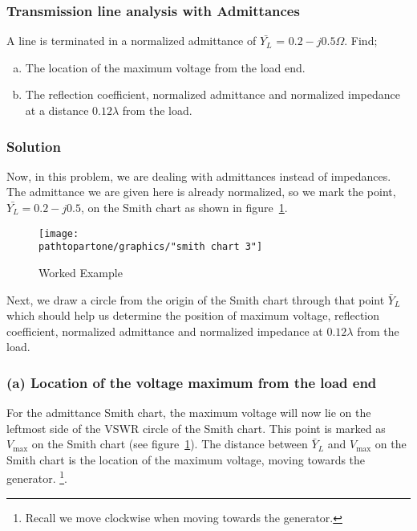 \begin{exmp}
\subsubsection*{Transmission line analysis with Admittances}
A line is terminated in a normalized admittance of $\bar{Y_{L}}$ =  $0.2-j0.5\varOmega$. Find;
\begin{enumerate}[(a)]
\item The location of the maximum voltage from the load end. 
\item The reflection coefficient, normalized admittance and normalized impedance at a distance $0.12\lambda$ from the load.
\end{enumerate}

\subsubsection*{Solution}
Now, in this problem, we are dealing with admittances instead of impedances. The admittance we are given here is already normalized, so we mark the point, $\bar{Y_L} = 0.2 - j0.5$, on the Smith chart as shown in figure~\ref{fig:workedexample3}.
\begin{figure}[h]
\centering
\texttt{[image: \\pathtopartone/graphics/"smith chart 3"]}
\caption{Worked Example}
\label{fig:workedexample3}
\end{figure}

Next, we draw a circle from the origin of the Smith chart through that point $\bar{Y}_L$ which should help us determine the position of maximum voltage, reflection coefficient, normalized admittance and normalized impedance at $0.12\lambda$ from the load.

\subsubsection*{(a) Location of the voltage maximum from the load end}
For the admittance Smith chart, the maximum voltage will now lie on the leftmost side of the VSWR circle of the Smith chart. This point is marked as $V_\max$ on the Smith chart (see figure~\ref{fig:workedexample3}). The distance between $\bar{Y}_L$ and $V_\max$ on the Smith chart is the location of the maximum voltage, moving towards the generator. \footnote{
Recall we move clockwise when moving towards the generator.
}.


\end{exmp}

